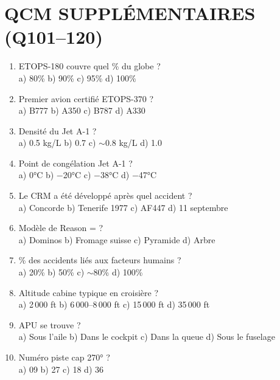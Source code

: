\section*{QCM SUPPLÉMENTAIRES (Q101--120)}

\begin{enumerate}[nosep, start=101]
\item ETOPS-180 couvre quel \% du globe ? \\ a) 80\% \quad b) 90\% \quad c) 95\% \quad d) 100\%

\item Premier avion certifié ETOPS-370 ? \\ a) B777 \quad b) A350 \quad c) B787 \quad d) A330

\item Densité du Jet A-1 ? \\ a) 0.5 kg/L \quad b) 0.7 \quad c) $\sim$0.8 kg/L \quad d) 1.0

\item Point de congélation Jet A-1 ? \\ a) 0°C \quad b) $-$20°C \quad c) $-$38°C \quad d) $-$47°C

\item Le CRM a été développé après quel accident ? \\ a) Concorde \quad b) Tenerife 1977 \quad c) AF447 \quad d) 11 septembre

\item Modèle de Reason = ? \\ a) Dominos \quad b) Fromage suisse \quad c) Pyramide \quad d) Arbre

\item \% des accidents liés aux facteurs humains ? \\ a) 20\% \quad b) 50\% \quad c) $\sim$80\% \quad d) 100\%

\item Altitude cabine typique en croisière ? \\ a) 2\,000 ft \quad b) 6\,000--8\,000 ft \quad c) 15\,000 ft \quad d) 35\,000 ft

\item APU se trouve ? \\ a) Sous l'aile \quad b) Dans le cockpit \quad c) Dans la queue \quad d) Sous le fuselage

\item Numéro piste cap 270° ? \\ a) 09 \quad b) 27 \quad c) 18 \quad d) 36


\end{enumerate}
